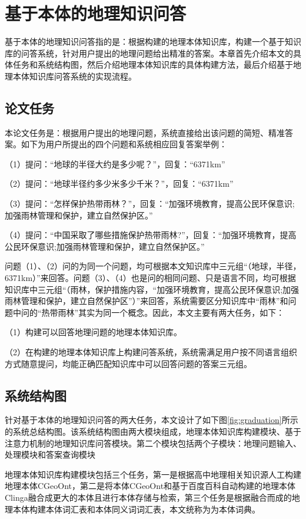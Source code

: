 \chapter{基于本体的地理知识问答}\label{chapter:al_sup}
基于本体的地理知识问答指的是：根据构建的地理本体知识库，构建一个基于知识库的问答系统，针对用户提出的地理问题给出精准的答案。本章首先介绍本文的具体任务和系统结构图，然后介绍地理本体知识库的具体构建方法，最后介绍基于地理本体知识库问答系统的实现流程。

\section{论文任务}
本论文任务是：根据用户提出的地理问题，系统直接给出该问题的简短、精准答案。如下为用户所提出的四个问题和系统相应回复答案举例：

（1）提问：“地球的半径大约是多少呢？”，回复：“6371km”

（2）提问：“地球半径约多少米多少千米？”，回复：“6371km”

（3）提问：“怎样保护热带雨林？”，回复：“加强环境教育，提高公民环保意识;加强雨林管理和保护，建立自然保护区。”

（4）提问：“中国采取了哪些措施保护热带雨林?”，回复：“加强环境教育，提高公民环保意识;加强雨林管理和保护，建立自然保护区。”

问题（1）、（2）问的为同一个问题，均可根据本文知识库中三元组“（地球，半径，6371km）”来回答。问题（3）、（4）也是问的相同问题、只是语言不同，均可根据知识库中三元组“（雨林，保护措施内容，“加强环境教育，提高公民环保意识;加强雨林管理和保护，建立自然保护区”）”来回答，系统需要区分知识库中“雨林”和问题中问的“热带雨林”其实为同一个概念。因此，本文主要有两大任务，如下：

（1）构建可以回答地理问题的地理本体知识库。

（2）在构建的地理本体知识库上构建问答系统，系统需满足用户按不同语言组织方式随意提问，均能正确匹配知识库中可以回答问题的答案三元组。

\section{系统结构图}
针对基于本体的地理知识问答的两大任务，本文设计了如下图\ref{fig:graduation}所示的系统总结构图。该系统结构图由两大模块组成，地理本体知识库构建模块、基于注意力机制的地理知识库问答模块。第二个模块包括两个子模块：地理问题输入、处理模块和答案查询模块

地理本体知识库构建模块包括三个任务，第一是根据高中地理相关知识源人工构建地理本体CGeoOnt，第二是将本体CGeoOnt和基于百度百科自动构建的地理本体Clinga融合成更大的本体且进行本体存储与检索，第三个任务是根据融合而成的地理本体构建本体词汇表和本体同义词词汇表，本文统称为为本体词典。


